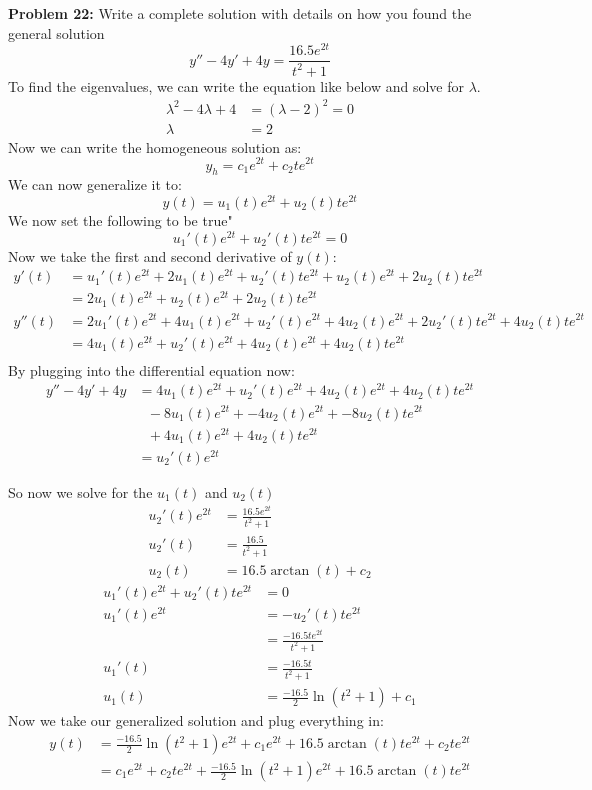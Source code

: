 \documentclass[12pt]{article}
\begin{document}
\noindent \textbf{Problem 22: }Write a complete solution with details on how you found the general solution
	$$
	y'' - 4y' + 4y = \frac{16.5e^{2t}}{t^2 + 1}
	$$
To find the eigenvalues, we can write the equation like below and solve for $\lambda$.
	\begin{align*}
		\lambda^2  -4\lambda + 4 &= (\lambda - 2)^2 = 0 	\\
		\lambda &= 2 				
	\end{align*}
Now we can write the homogeneous solution as: 
	$$
	y_h = c_1e^{2t} + c_2te^{2t}
	$$
We can now generalize it to:
	$$
	y(t) = u_1(t)e^{2t} + u_2(t)te^{2t}
	$$
We now set the following to be true"
	$$
	u_1'(t)e^{2t} + u_2'(t)te^{2t} = 0
	$$
Now we take the first and second derivative of $y(t)$:
	\begin{align*}
		y'(t) &= u_1'(t)e^{2t} + 2u_1(t)e^{2t} + u_2'(t)te^{2t} + u_2(t)e^{2t} + 2u_2(t)te^{2t} \\
		&= 2u_1(t)e^{2t} + u_2(t)e^{2t} + 2u_2(t)te^{2t} \\
		y''(t) &= 2u_1'(t)e^{2t} +4u_1(t)e^{2t} + u_2'(t)e^{2t} + 4u_2(t)e^{2t} + 2u_2'(t)te^{2t} + 4u_2(t)te^{2t} \\
		&= 4u_1(t)e^{2t} + u_2'(t)e^{2t} + 4u_2(t)e^{2t} + 4u_2(t)te^{2t} \\
	\end{align*}
By plugging into the differential equation now:
	\begin{align*}
		y'' - 4y' + 4y &= 4u_1(t)e^{2t} + u_2'(t)e^{2t} + 4u_2(t)e^{2t} + 4u_2(t)te^{2t} \\
		&\text{ } -8u_1(t)e^{2t} + -4u_2(t)e^{2t} + -8u_2(t)te^{2t}\\
		&\text{ } + 4u_1(t)e^{2t} + 4u_2(t)te^{2t} \\
		&= u_2'(t)e^{2t}
	\end{align*}
	
\newpage

\noindent So now we solve for the $u_1(t)$ and $u_2(t)$
	\begin{align*}
		u_2'(t)e^{2t} &= \frac{16.5e^{2t}}{t^2 + 1} \\
		u_2'(t) &= \frac{16.5}{t^2 + 1} \\
		u_2(t) &= 16.5\arctan(t) + c_2
	\end{align*}
	\begin{align*}
		u_1'(t)e^{2t} + u_2'(t)te^{2t} &= 0 \\
		u_1'(t)e^{2t} &= -u_2'(t)te^{2t} \\
		&= \frac{-16.5te^{2t}}{t^2 + 1} \\
		u_1'(t) &= \frac{-16.5t}{t^2 + 1} \\
		u_1(t) &= \frac{-16.5}{2}\ln(t^2 + 1) + c_1
	\end{align*}
Now we take our generalized solution and plug everything in:
	\begin{align*}
		y(t) &= \frac{-16.5}{2}\ln(t^2 + 1)e^{2t} + c_1e^{2t} + 16.5\arctan(t)te^{2t} + c_2te^{2t} \\
		&= c_1e^{2t} + c_2te^{2t} + \frac{-16.5}{2}\ln(t^2 + 1)e^{2t} + 16.5\arctan(t)te^{2t}
	\end{align*}
	
	
	
	
	
	
	
	
	
	
	
\end{document}

